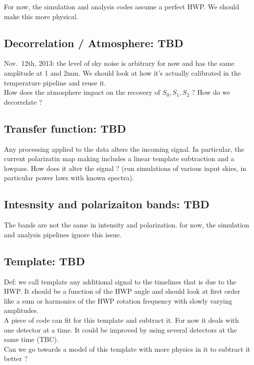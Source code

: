 \documentclass[a4paper]{article}
\begin{document}
For now, the simulation and analysis codes assume a perfect HWP. We should make
this more physical.

\subsection{Decorrelation / Atmosphere: TBD}

Nov.~12th, 2013: the level of sky noise is arbitrary for now and has the same
amplitude at 1 and 2mm. We should look at how it's actually calibrated in the
temperature pipeline and reuse it.\\

How does the atmosphere impact on the recovery of $S_0, S_1, S_2$ ? How do we
decorrelate ?

\subsection{Transfer function: TBD}

Any processing applied to the data alters the incoming signal. In particular,
the current polarizatin map making includes a linear template subtraction and a
lowpass. How does it alter the signal ? (run simulations of various input skies,
in particular power laws with known spectra).

\subsection{Intesnsity and polarizaiton bands: TBD}

The bands are not the same in intensity and polarization. for now, the
simulation and analysis pipelines ignore this issue.


\subsection{Template: TBD}

Def: we call template any additional signal to the timelines that is due to the
HWP. It should be a function of the HWP angle and should look at first order
like a sum or harmonics of the HWP rotation frequency with slowly varying
amplitudes.\\

A piece of code can fit for this template and subtract it. For now it deals with
one detector at a time. It could be improved by using several detectors at the
same time (TBC).\\

Can we go towards a model of this template with more physics in it to subtract
it better ?
\end{document}
